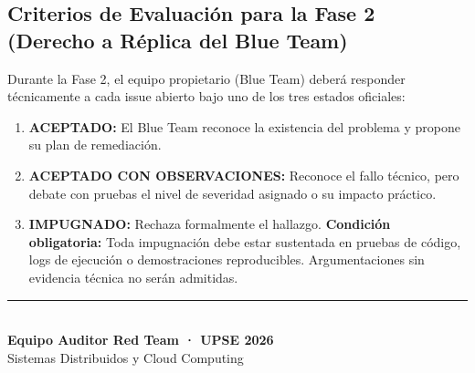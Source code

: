 \documentclass[10pt,a4paper]{article}
\begin{document}
\subsection{Criterios de Evaluación para la Fase 2 (Derecho a Réplica del Blue Team)}
Durante la Fase 2, el equipo propietario (Blue Team) deberá responder técnicamente a cada issue abierto bajo uno de los tres estados oficiales:
\begin{enumerate}[leftmargin=*]
    \item \textbf{ACEPTADO:} El Blue Team reconoce la existencia del problema y propone su plan de remediación.
    \item \textbf{ACEPTADO CON OBSERVACIONES:} Reconoce el fallo técnico, pero debate con pruebas el nivel de severidad asignado o su impacto práctico.
    \item \textbf{IMPUGNADO:} Rechaza formalmente el hallazgo. \textbf{Condición obligatoria:} Toda impugnación debe estar sustentada en pruebas de código, logs de ejecución o demostraciones reproducibles. Argumentaciones sin evidencia técnica no serán admitidas.
\end{enumerate}

\vspace{1.5cm}
\begin{center}
\rule{0.6\textwidth}{0.4pt}\\[0.3em]
\textbf{Equipo Auditor Red Team · UPSE 2026}\\
\small Sistemas Distribuidos y Cloud Computing
\end{center}
\end{document}
